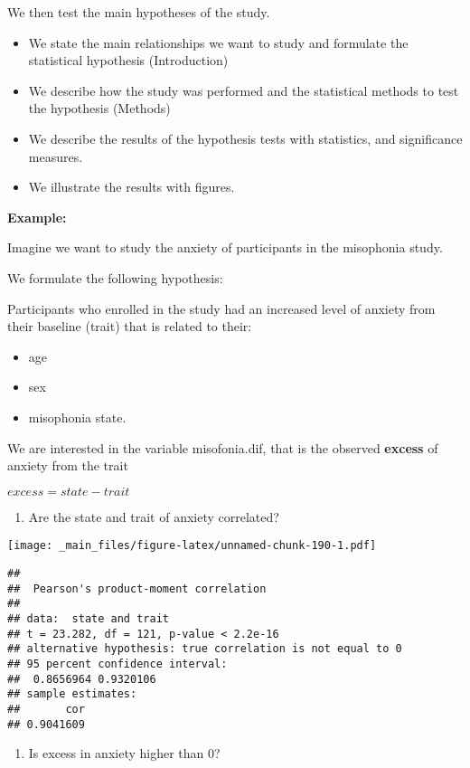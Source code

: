 \documentclass[
]{book}
\providecommand{\tightlist}{%
  \setlength{\itemsep}{0pt}\setlength{\parskip}{0pt}}
\begin{document}
We then test the main hypotheses of the study.

\begin{itemize}
\item
  We state the main relationships we want to study and formulate the statistical hypothesis (Introduction)
\item
  We describe how the study was performed and the statistical methods to test the hypothesis (Methods)
\item
  We describe the results of the hypothesis tests with statistics, and significance measures.
\item
  We illustrate the results with figures.
\end{itemize}

\textbf{Example:}

Imagine we want to study the anxiety of participants in the misophonia study.

We formulate the following hypothesis:

Participants who enrolled in the study had an increased level of anxiety from their baseline (trait) that is related to their:

\begin{itemize}
\tightlist
\item
  age
\item
  sex
\item
  misophonia state.
\end{itemize}

We are interested in the variable misofonia.dif, that is the observed \textbf{excess} of anxiety from the trait

\(excess = state - trait\)

\begin{enumerate}
\def\labelenumi{\arabic{enumi}.}
\tightlist
\item
  Are the state and trait of anxiety correlated?
\end{enumerate}

\texttt{[image: \_main\_files/figure-latex/unnamed-chunk-190-1.pdf]}

\begin{verbatim}
## 
##  Pearson's product-moment correlation
## 
## data:  state and trait
## t = 23.282, df = 121, p-value < 2.2e-16
## alternative hypothesis: true correlation is not equal to 0
## 95 percent confidence interval:
##  0.8656964 0.9320106
## sample estimates:
##       cor 
## 0.9041609
\end{verbatim}

\begin{enumerate}
\def\labelenumi{\arabic{enumi}.}
\setcounter{enumi}{1}
\tightlist
\item
  Is excess in anxiety higher than \(0\)?
\end{enumerate}
\end{document}
